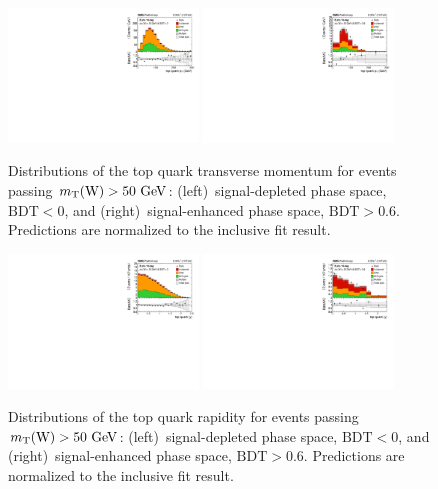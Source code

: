\documentclass[12pt]{article}
\begin{document}
\begin{figure}[th]
\begin{center}
\includegraphics[width=0.45\textwidth]{figures/unfolding/reco_toppt_bdtinv.pdf}\hspace{0.05\textwidth}
\includegraphics[width=0.45\textwidth]{figures/unfolding/reco_toppt_bdt.pdf}
\end{center}

\caption{\label{fig:recotop-pt}Distributions of the top quark transverse momentum for events passing $m_{\mathrm{T}}(\mathrm{W})>50~\mathrm{GeV}$: (left)~signal-depleted phase space, $\mathrm{BDT}<0$, and (right)~signal-enhanced phase space, $\mathrm{BDT}>0.6$. Predictions are normalized to the inclusive fit result.}
\end{figure}

\begin{figure}[th]
\begin{center}
\includegraphics[width=0.45\textwidth]{figures/unfolding/reco_topy_bdtinv.pdf}\hspace{0.05\textwidth}
\includegraphics[width=0.45\textwidth]{figures/unfolding/reco_topy_bdt.pdf}
\end{center}

\caption{\label{fig:recotop-y}Distributions of the top quark rapidity for events passing $m_{\mathrm{T}}(\mathrm{W})>50~\mathrm{GeV}$: (left)~signal-depleted phase space, $\mathrm{BDT}<0$, and (right)~signal-enhanced phase space, $\mathrm{BDT}>0.6$. Predictions are normalized to the inclusive fit result.}
\end{figure}
\end{document}
